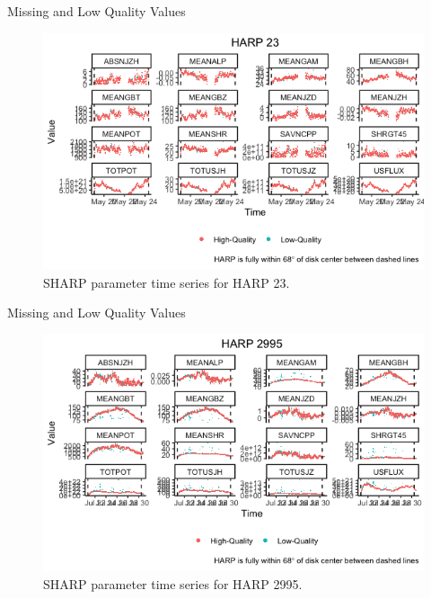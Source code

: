 \documentclass{beamer}
\begin{document}
\begin{frame}{Missing and Low Quality Values}
    \begin{figure}[!htb]
        \centering
        \includegraphics[scale=0.5]{harp23.png}
        \caption{SHARP parameter time series for HARP 23.}
        \label{fig:na_props_flux}
    \end{figure}
\end{frame}

\begin{frame}{Missing and Low Quality Values}
    \begin{figure}[!htb]
        \centering
        \includegraphics[scale=0.5]{harp2995.png}
        \caption{SHARP parameter time series for HARP 2995.}
        \label{fig:na_props_flux}
    \end{figure}
\end{frame}
\end{document}
